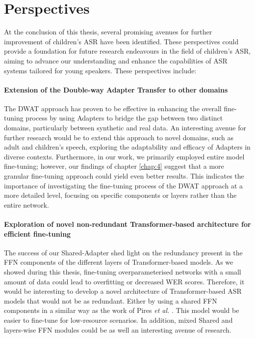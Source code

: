 \section{Perspectives}
At the conclusion of this thesis, several promising avenues for further improvement of children's \ac{ASR} have been identified. These perspectives could provide a foundation for future research endeavours in the field of children's \ac{ASR}, aiming to advance our understanding and enhance the capabilities of \ac{ASR} systems tailored for young speakers. These perspectives include:

\paragraph*{Extension of the Double-way Adapter Transfer to other domains} The \ac{DWAT} approach has proven to be effective in enhancing the overall fine-tuning process by using Adapters to bridge the gap between two distinct domains, particularly between synthetic and real data. An interesting avenue for further research would be to extend this approach to novel domains, such as adult and children's speech, exploring the adaptability and efficacy of Adapters in diverse contexts. Furthermore, in our work, we primarily employed entire model fine-tuning; however, our findings of chapter \ref{chap:4} suggest that a more granular fine-tuning approach could yield even better results. This indicates the importance of investigating the fine-tuning process of the \ac{DWAT} approach at a more detailed level, focusing on specific components or layers rather than the entire network. 

\paragraph*{Exploration of novel non-redundant Transformer-based architecture for efficient fine-tuning} The success of our Shared-Adapter shed light on the redundancy present in the \ac{FFN} components of the different layers of Transformer-based models. As we showed during this thesis, fine-tuning overparameterised networks with a small amount of data could lead to overfitting or decreased \ac{WER} scores. Therefore, it would be interesting to develop a novel architecture of Transformer-based \ac{ASR} models that would not be as redundant. Either by using a shared \ac{FFN} components in a similar way as the work of Pires \textit{et al.} \cite{pires2023one}. This model would be easier to fine-tune for low-resource scenarios. In addition, mixed Shared and layers-wise \ac{FFN} modules could be as well an interesting avenue of research.

